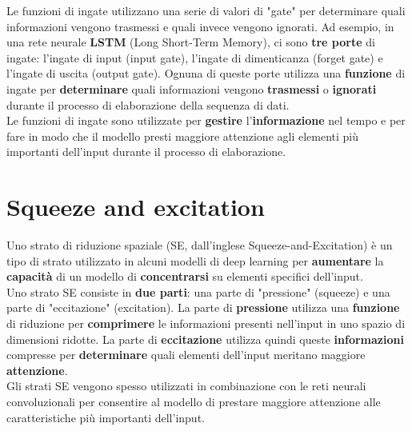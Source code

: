 \documentclass{article}
\begin{document}
Le funzioni di ingate utilizzano una serie di valori di "gate" per determinare quali informazioni vengono trasmessi e quali invece vengono ignorati. Ad esempio, in una rete neurale \textbf{LSTM} (Long Short-Term Memory), ci sono \textbf{tre porte} di ingate: l'ingate di input (input gate), l'ingate di dimenticanza (forget gate) e l'ingate di uscita (output gate). Ognuna di queste porte utilizza una \textbf{funzione} di ingate per \textbf{determinare} quali informazioni vengono \textbf{trasmessi} o \textbf{ignorati} durante il processo di elaborazione della sequenza di dati.\\

Le funzioni di ingate sono utilizzate per \textbf{gestire} l'\textbf{informazione} nel tempo e per fare in modo che il modello presti maggiore attenzione agli elementi più importanti dell'input durante il processo di elaborazione. 

\section{Squeeze and excitation}
Uno strato di riduzione spaziale (SE, dall'inglese Squeeze-and-Excitation) è un tipo di strato utilizzato in alcuni modelli di deep learning per \textbf{aumentare} la \textbf{capacità} di un modello di \textbf{concentrarsi} su elementi specifici dell'input.\\

Uno strato SE consiste in \textbf{due parti}: una parte di "pressione" (squeeze) e una parte di "eccitazione" (excitation). La parte di \textbf{pressione} utilizza una \textbf{funzione} di riduzione per \textbf{comprimere} le informazioni presenti nell'input in uno spazio di dimensioni ridotte. La parte di \textbf{eccitazione} utilizza quindi queste \textbf{informazioni} compresse per \textbf{determinare} quali elementi dell'input meritano maggiore \textbf{attenzione}.\\

Gli strati SE vengono spesso utilizzati in combinazione con le reti neurali convoluzionali per consentire al modello di prestare maggiore attenzione alle caratteristiche più importanti dell'input.
\end{document}
